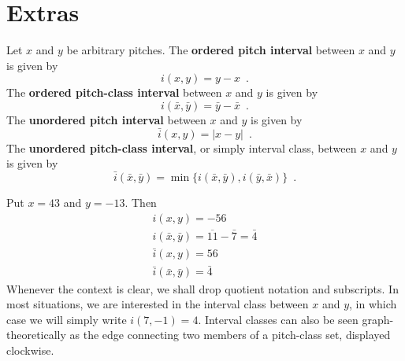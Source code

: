 \chapter{Extras}

\begin{definition}
    Let $x$ and $y$ be arbitrary pitches. The \textbf{ordered pitch interval} between
    $x$ and $y$ is given by
    \begin{equation}
        i(x, y) = y - x \enspace.
    \end{equation}
    The \textbf{ordered pitch-class interval} between $x$ and $y$ is given by
    \begin{equation}
        i(\bar{x}, \bar{y}) = \bar{y} - \bar{x} \enspace.
    \end{equation}
    The \textbf{unordered pitch interval} between $x$ and $y$ is given by
    \begin{equation}
        \bar{i}(x, y) = |x - y| \enspace.
    \end{equation}
    The \textbf{unordered pitch-class interval}, or simply interval class, between
    $x$ and $y$ is given by
    \begin{equation}
        \bar{i}(\bar{x}, \bar{y}) = \min\{i(\bar{x}, \bar{y}), i(\bar{y}, \bar{x})\} \enspace.
    \end{equation}
\end{definition}

\begin{example}
    Put $x = 43$ and $y = -13$. Then
    \begin{gather}
        i(x, y) = -56 \\
        i(\bar{x}, \bar{y}) = \overline{11} - \bar{7} = \bar{4} \\
        \bar{i}(x, y) = 56 \\
        \bar{i}(\bar{x}, \bar{y}) = \bar{4}
    \end{gather}
    Whenever the context is clear, we shall drop quotient notation and subscripts.
    In most situations, we are interested in the interval class between $x$ and $y$,
    in which case we will simply write $i(7, -1) = 4$. Interval classes can also be
    seen graph-theoretically as the edge connecting two members of a pitch-class set,
    displayed clockwise.
\end{example}

